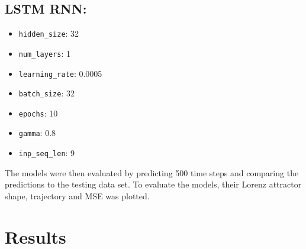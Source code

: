 \documentclass[11pt]{article}
\begin{document}
\begin{multicols}{3}
    \subsection*{LSTM RNN:}
    \begin{itemize}
        \item \texttt{hidden\_size}: 32
        \item \texttt{num\_layers}: 1
        \item \texttt{learning\_rate}: 0.0005
        \item \texttt{batch\_size}: 32
        \item \texttt{epochs}: 10
        \item \texttt{gamma}: 0.8
        \item \texttt{inp\_seq\_len}: 9
    \end{itemize}
\end{multicols}

The models were then evaluated by predicting 500 time steps and comparing the predictions to the testing data set. To evaluate the models, their Lorenz attractor shape, trajectory and MSE was plotted.

\section{Results}
\end{document}
